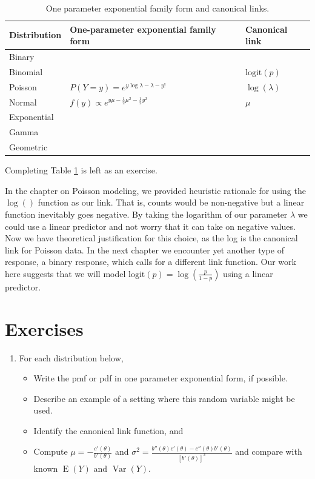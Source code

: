 \documentclass[
]{krantz}
\providecommand{\tightlist}{%
  \setlength{\itemsep}{0pt}\setlength{\parskip}{0pt}}
\newcommand{\E}{\operatorname{E}}
\newcommand{\var}{\operatorname{Var}}
\begin{document}
\begin{table}

\caption{\label{tab:table1chp5}One parameter exponential family form and canonical links.}
\centering
\begin{tabular}[t]{lll}
\toprule
Distribution & One-parameter exponential family form & Canonical link\\
\midrule
Binary &  & \\
Binomial &  & $\text{logit}(p)$\\
Poisson & $P(Y=y) = e^{y\log\lambda - \lambda - y!}$ & $\log(\lambda)$\\
Normal & $f(y) \propto e^{y\mu -\frac{1}{2}\mu^2 -\frac{1}{2}y^2}$ & $\mu$\\
Exponential &  & \\
\addlinespace
Gamma &  & \\
Geometric &  & \\
\bottomrule
\end{tabular}
\end{table}

Completing Table \ref{tab:table1chp5} is left as an exercise.

In the chapter on Poisson modeling, we provided heuristic rationale for using the \(\log()\) function as our link. That is, counts would be non-negative but a linear function inevitably goes negative. By taking the logarithm of our parameter \(\lambda\) we could use a linear predictor and not worry that it can take on negative values. Now we have theoretical justification for this choice, as the log is the canonical link for Poisson data. In the next chapter we encounter yet another type of response, a binary response, which calls for a different link function. Our work here suggests that we will model \(\text{logit}(p)=\log\left(\frac{p}{1-p}\right)\) using a linear predictor.

\hypertarget{exercises-4}{%
\section{Exercises}\label{exercises-4}}

\begin{enumerate}
\def\labelenumi{\arabic{enumi}.}
\item
  For each distribution below,

  \begin{itemize}
  \tightlist
  \item
    Write the pmf or pdf in one parameter exponential form, if possible.
  \item
    Describe an example of a setting where this random variable might be used.
  \item
    Identify the canonical link function, and
  \item
    Compute \(\mu = -\frac{c'(\theta)}{b'(\theta)}\) and \(\sigma^2 = \frac{b''(\theta)c'(\theta)-c''(\theta)b'(\theta)}{[b'(\theta)]^3}\) and compare with known \(\E(Y)\) and \(\var(Y)\).
  \end{itemize}
\end{enumerate}
\end{document}

